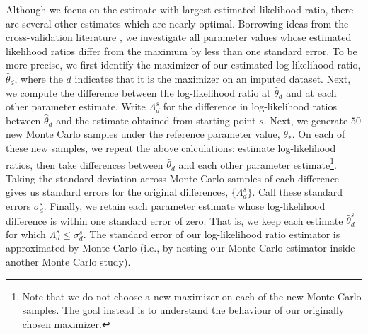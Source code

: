 \documentclass[11pt, oneside]{article}   	%
\begin{document}
Although we focus on the estimate with largest estimated likelihood ratio, there are several other estimates which are nearly optimal. Borrowing ideas from the cross-validation literature \citep[see, e.g., Section 7.10 of][]{Has09}, we investigate all parameter values whose estimated likelihood ratios differ from the maximum by less than one standard error. To be more precise, we first identify the maximizer of our estimated log-likelihood ratio, $\hat{\theta}_d$, where the $d$ indicates that it is the maximizer on an imputed dataset. Next, we compute the difference between the log-likelihood ratio at $\hat{\theta}_d$ and at each other parameter estimate. Write $\Lambda_d^s$ for the difference in log-likelihood ratios between $\hat{\theta}_d$ and the estimate obtained from starting point $s$. Next, we generate $50$ new Monte Carlo samples under the reference parameter value, $\theta_*$. On each of these new samples, we repeat the above calculations: estimate log-likelihood ratios, then take differences between $\hat{\theta}_d$ and each other parameter estimate\footnote{Note that we do not choose a new maximizer on each of the new Monte Carlo samples. The goal instead is to understand the behaviour of our originally chosen maximizer.}. Taking the standard deviation across Monte Carlo samples of each difference gives us standard errors for the original differences, $\{\Lambda_d^s\}$. Call these standard errors $\sigma_d^s$. Finally, we retain each parameter estimate whose log-likelihood difference is within one standard error of zero. That is, we keep each estimate $\hat{\theta}_d^s$ for which $\Lambda_d^s \leq \sigma_d^s$.  The standard error of our log-likelihood ratio estimator is approximated by Monte Carlo (i.e., by nesting our Monte Carlo estimator inside another Monte Carlo study). 

\end{document}
